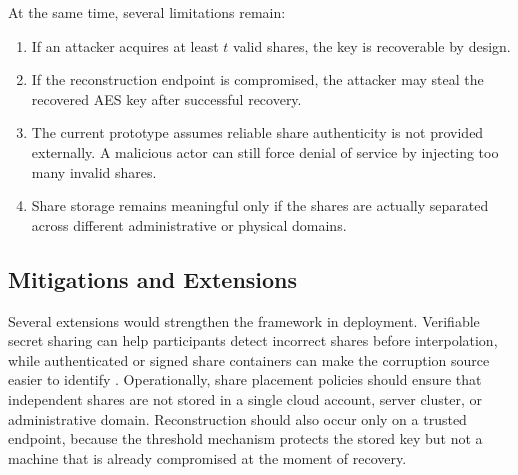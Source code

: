At the same time, several limitations remain:
\begin{enumerate}
\item If an attacker acquires at least $t$ valid shares, the key is recoverable by design.
\item If the reconstruction endpoint is compromised, the attacker may steal the recovered AES key after successful recovery.
\item The current prototype assumes reliable share authenticity is not provided externally. A malicious actor can still force denial of service by injecting too many invalid shares.
\item Share storage remains meaningful only if the shares are actually separated across different administrative or physical domains.
\end{enumerate}

\subsection{Mitigations and Extensions}

Several extensions would strengthen the framework in deployment. Verifiable secret sharing can help participants detect incorrect shares before interpolation, while authenticated or signed share containers can make the corruption source easier to identify \cite{cheraghchi2019}. Operationally, share placement policies should ensure that independent shares are not stored in a single cloud account, server cluster, or administrative domain. Reconstruction should also occur only on a trusted endpoint, because the threshold mechanism protects the stored key but not a machine that is already compromised at the moment of recovery.
